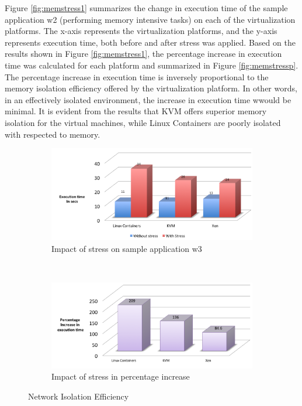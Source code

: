Figure \ref{fig:memstress1} summarizes the change in execution time of the sample application w2 (performing memory intensive tasks) on each of the virtualization platforms. The x-axis represents the virtualization platforms, and the y-axis represents execution time, both before and after stress was applied. Based on the results shown in Figure \ref{fig:memstress1}, the percentage increase in execution time was calculated for each platform and summarized in Figure \ref{fig:memstressp}. The percentage increase in execution time is inversely proportional to the memory isolation efficiency offered by the virtualization platform. In other words, in an effectively isolated environment, the increase in execution time wwould be minimal. It is evident from the results that KVM offers superior memory isolation for the virtual machines, while Linux Containers are poorly isolated with respected to memory.

\begin{figure}[H]
        \centering
        \begin{subfigure}[b]{0.99\textwidth}
                \includegraphics[width=\textwidth]{netstress.png}
                \caption{Impact of stress on sample application w3}
                \label{fig:netstress1}
        \end{subfigure}%
        ~ %
        \qquad \newline %
        \begin{subfigure}[b]{0.8\textwidth}
                \includegraphics[width=\textwidth]{netstressp.png}
                \caption{Impact of stress in percentage increase}
                \label{fig:netstressp}
        \end{subfigure}
        \caption{Network Isolation Efficiency}\label{fig:netisolation}
\end{figure}

